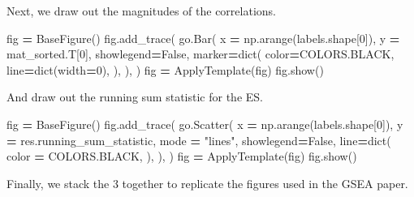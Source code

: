 \documentclass[
]{book}
\newenvironment{Shaded}{\begin{snugshade}}{\end{snugshade}}
\newcommand{\BuiltInTok}[1]{#1}
\newcommand{\DecValTok}[1]{\textcolor[rgb]{0.00,0.00,0.81}{#1}}
\newcommand{\NormalTok}[1]{#1}
\newcommand{\OperatorTok}[1]{\textcolor[rgb]{0.81,0.36,0.00}{\textbf{#1}}}
\newcommand{\StringTok}[1]{\textcolor[rgb]{0.31,0.60,0.02}{#1}}
\newcommand{\VariableTok}[1]{\textcolor[rgb]{0.00,0.00,0.00}{#1}}
\begin{document}
Next, we draw out the magnitudes of the correlations.

\begin{Shaded}
\begin{Highlighting}[numbers=left,,]
\NormalTok{fig }\OperatorTok{=}\NormalTok{ BaseFigure()}
\NormalTok{fig.add\_trace(}
\NormalTok{    go.Bar(}
\NormalTok{        x }\OperatorTok{=}\NormalTok{ np.arange(labels.shape[}\DecValTok{0}\NormalTok{]),}
\NormalTok{        y }\OperatorTok{=}\NormalTok{ mat\_sorted.T[}\DecValTok{0}\NormalTok{],}
\NormalTok{        showlegend}\OperatorTok{=}\VariableTok{False}\NormalTok{,}
\NormalTok{        marker}\OperatorTok{=}\BuiltInTok{dict}\NormalTok{(}
\NormalTok{            color}\OperatorTok{=}\NormalTok{COLORS.BLACK,}
\NormalTok{            line}\OperatorTok{=}\BuiltInTok{dict}\NormalTok{(width}\OperatorTok{=}\DecValTok{0}\NormalTok{),}
\NormalTok{        ),}
\NormalTok{    ),}
\NormalTok{)}
\NormalTok{fig }\OperatorTok{=}\NormalTok{ ApplyTemplate(fig)}
\NormalTok{fig.show()}
\end{Highlighting}
\end{Shaded}

And draw out the running sum statistic for the ES.

\begin{Shaded}
\begin{Highlighting}[numbers=left,,]
\NormalTok{fig }\OperatorTok{=}\NormalTok{ BaseFigure()}
\NormalTok{fig.add\_trace(}
\NormalTok{    go.Scatter(}
\NormalTok{        x }\OperatorTok{=}\NormalTok{ np.arange(labels.shape[}\DecValTok{0}\NormalTok{]),}
\NormalTok{        y }\OperatorTok{=}\NormalTok{ res.running\_sum\_statistic,}
\NormalTok{        mode }\OperatorTok{=} \StringTok{"lines"}\NormalTok{,}
\NormalTok{        showlegend}\OperatorTok{=}\VariableTok{False}\NormalTok{,}
\NormalTok{        line}\OperatorTok{=}\BuiltInTok{dict}\NormalTok{(}
\NormalTok{            color }\OperatorTok{=}\NormalTok{ COLORS.BLACK,}
\NormalTok{        ),}
\NormalTok{    ),}
\NormalTok{)}
\NormalTok{fig }\OperatorTok{=}\NormalTok{ ApplyTemplate(fig)}
\NormalTok{fig.show()}
\end{Highlighting}
\end{Shaded}

Finally, we stack the 3 together to replicate the figures used in the GSEA paper.
\end{document}

